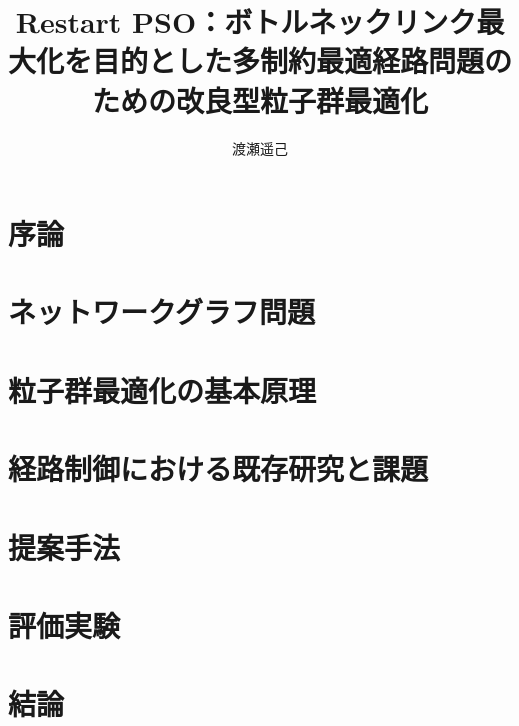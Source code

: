 \documentclass[bachelor]{soturon}
\title{Restart PSO：ボトルネックリンク最大化を目的とした多制約最適経路問題のための改良型粒子群最適化}
\author{渡瀬遥己}
\begin{document}
\maketitle
\frontmatter

\tableofcontents                    %

\mainmatter%

\chapter{序論\label{intro}}


\chapter{ネットワークグラフ問題\label{netoworkgraph}}


\chapter{粒子群最適化の基本原理\label{metaheuristics}}


\chapter{経路制御における既存研究と課題\label{relate}}


\chapter{提案手法\label{proposedmethod}}


\chapter{評価実験\label{simulation}}


\chapter{結論\label{conclusion}}

\end{document}

